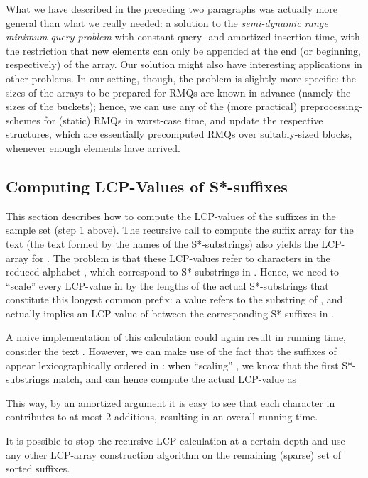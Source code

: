 \documentclass[11pt,onecolumn,final]{article} \usepackage[latin1]{inputenc}
\theoremstyle{plain}
\theoremstyle{remark}
\begin{document}
What we have described in the preceding two paragraphs was actually more general than what we really needed: a solution to the \emph{semi-dynamic range minimum query problem} with constant  query- and amortized  insertion-time, with the restriction that new elements can only be appended at the end (or beginning, respectively) of the array. Our solution might also have interesting applications in other problems. In our setting, though, the problem is slightly more specific: the sizes of the arrays to be prepared for RMQs are known in advance (namely the sizes of the buckets); hence, we can use any of the (more practical) preprocessing-schemes for (static) RMQs in  worst-case time\cite{fischer07new,alstrup04nearest}, and update the respective structures, which are essentially precomputed RMQs over suitably-sized blocks, whenever enough elements have arrived.

\subsection{Computing LCP-Values of S*-suffixes}
\label{sect:recursive_lcp}
This section describes how to compute the LCP-values of the suffixes in the sample set (step 1 above). The recursive call to compute the suffix array  for the text  (the text formed by the names of the S*-substrings) also yields the LCP-array  for . The problem is that these LCP-values refer to characters  in the reduced alphabet , which correspond to S*-substrings  in . Hence, we need to ``scale'' every LCP-value in  by the lengths of the actual S*-substrings that constitute this longest common prefix: a value  refers to the substring  of , and actually implies an LCP-value of  between the corresponding S*-suffixes in .

A naive implementation of this calculation could again result in  running time, consider the text . However, we can make use of the fact that the suffixes of  appear lexicographically ordered in : when ``scaling'' , we know that the first  S*-substrings match, and can hence compute the actual LCP-value as

This way, by an amortized argument it is easy to see that each character in  contributes to at most 2 additions, resulting in an overall  running time.

It is possible to stop the recursive LCP-calculation at a certain depth and use any other LCP-array construction algorithm on the remaining (sparse) set of sorted suffixes.
\end{document}
